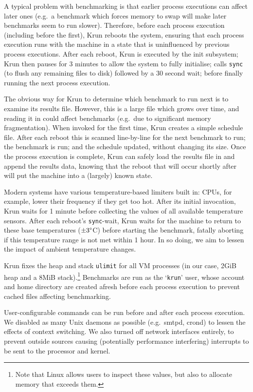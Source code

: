 \documentclass[acmsmall,screen]{acmart}
\newcommand{\krun}{Krun\xspace}
\begin{document}
A typical problem with benchmarking is that earlier process executions can
affect later ones (e.g.~a benchmark which forces memory to swap will make
later benchmarks seem to run slower). Therefore, before each process execution
(including before the first), \krun reboots the system, ensuring that each
process execution runs with the machine in a state that
is uninfluenced by previous process executions. After each reboot, \krun is
executed by the init subsystem; \krun then pauses for 3
minutes to allow the system to fully initialise; calls \texttt{sync} (to
flush any remaining files to disk) followed by a 30 second wait; before finally running the
next process execution.

The obvious way for \krun to determine which benchmark to run next is to examine
its results file. However, this is a large file which grows over time, and
reading it in could affect benchmarks (e.g.~due to significant memory
fragmentation). When invoked for the first time, \krun
creates a simple schedule file. After each reboot this is scanned
line-by-line for the next benchmark to run; the benchmark is run; and the schedule
updated, without changing its size. Once the process execution is
complete, \krun can safely load the results file in and append the results data,
knowing that the reboot that will occur shortly after will put the machine into
a (largely) known state.

Modern systems have various temperature-based limiters built in:
CPUs, for example, lower their frequency if they get too hot.
After its initial invocation, \krun waits for 1 minute before collecting
the values of all available temperature sensors. After each reboot's \texttt{sync}-wait, \krun waits
for the machine to return to these base temperatures ($\pm3\degree$C) before
starting the benchmark, fatally aborting if this temperature range is not
met within 1 hour. In so doing, we aim to lessen the impact of ambient temperature changes.

\krun fixes the heap and stack \texttt{ulimit} for all VM processes
(in our case, 2GiB heap and a 8MiB stack).\footnote{Note that Linux allows users
to inspect these values, but also to allocate memory that exceeds them.} Benchmarks are run
as the `\texttt{krun}' user, whose account and home directory are created
afresh before each process execution to prevent cached files affecting benchmarking.

User-configurable commands can be run before and after each process execution.
We disabled as many Unix daemons as possible (e.g.~smtpd,
crond) to lessen the effects of context switching. We also
turned off network interfaces entirely, to prevent outside sources causing
(potentially performance interfering) interrupts to be sent to the processor and kernel.
\end{document}

